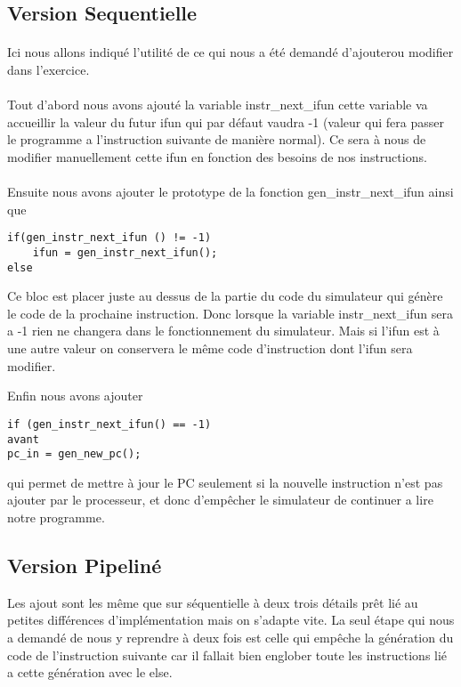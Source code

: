 \documentclass[12pt]{article}
\begin{document}
\subsection{Version Sequentielle}
\paragraph{}Ici nous allons indiqué l'utilité de ce qui nous a été demandé d'ajouterou modifier dans l'exercice.

\paragraph{}Tout d'abord nous avons  ajouté la variable instr\_next\_ifun cette variable va accueillir la valeur du futur ifun qui par défaut vaudra -1 (valeur qui fera passer le programme a l'instruction suivante de manière normal). Ce sera à nous de modifier manuellement cette ifun en fonction des besoins de nos instructions.

\paragraph{}Ensuite nous avons ajouter le prototype de la fonction gen\_instr\_next\_ifun ainsi que 
\begin{verbatim}
if(gen_instr_next_ifun () != -1)
	ifun = gen_instr_next_ifun();
else
\end{verbatim}
Ce bloc est placer juste au dessus de la partie du code du simulateur qui génère le code de la prochaine instruction. Donc lorsque la variable instr\_next\_ifun sera a -1 rien ne changera dans le fonctionnement du simulateur. Mais si l'ifun est à une autre valeur on conservera le même code d'instruction dont l'ifun sera modifier.

Enfin nous avons ajouter 
\begin{verbatim}
if (gen_instr_next_ifun() == -1)
avant
pc_in = gen_new_pc();
\end{verbatim}
qui permet de mettre à jour le PC seulement si la nouvelle instruction n'est pas ajouter par le processeur, et donc d’empêcher le simulateur de continuer a lire notre programme.

\subsection{Version Pipeliné}
Les ajout sont les même que sur séquentielle à deux trois détails prêt lié au petites différences d’implémentation mais on s’adapte vite. La seul étape qui nous a demandé de nous y reprendre à deux fois est celle qui empêche la génération du code de l'instruction suivante car il fallait bien englober toute les instructions lié a cette génération avec le else.
\end{document}
